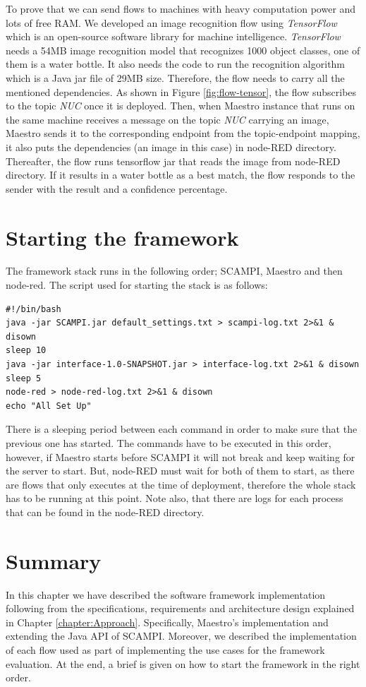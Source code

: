 To prove that we can send flows to machines with heavy computation power and lots of free RAM. We developed an image recognition flow using \textit{TensorFlow} which is an open-source software library for machine intelligence. \textit{TensorFlow} needs a 54MB image recognition model that recognizes 1000 object classes, one of them is a water bottle. It also needs the code to run the recognition algorithm which is a Java jar file of 29MB size. Therefore, the flow  needs to carry all the mentioned dependencies. As shown in Figure \ref{fig:flow-tensor}, the flow subscribes to the topic \textit{NUC} once it is deployed. Then, when Maestro instance that runs on the same machine receives a message on the topic \textit{NUC} carrying an image, Maestro sends it to the corresponding endpoint  from the topic-endpoint mapping, it also puts the dependencies (an image in this case) in node-RED directory. Thereafter, the flow runs tensorflow jar that reads the image from  node-RED directory. If it results in a water bottle as a best match, the flow responds to the sender with the result and a confidence percentage.

\section{Starting the framework}\label{subsec:starting-framework}

The framework stack runs in the following order; SCAMPI, Maestro and then node-red. The script used for starting the stack is as follows:
\begin{verbatim}
#!/bin/bash
java -jar SCAMPI.jar default_settings.txt > scampi-log.txt 2>&1 & disown
sleep 10
java -jar interface-1.0-SNAPSHOT.jar > interface-log.txt 2>&1 & disown
sleep 5
node-red > node-red-log.txt 2>&1 & disown
echo "All Set Up"
\end{verbatim}
There is a sleeping period between each command in order to make sure that the previous one has started. The commands have to be executed in this order, however, if Maestro starts before SCAMPI it will not break and keep waiting for the server to start. But, node-RED must wait for both of them to start, as there are flows that only executes at the time of deployment, therefore the whole stack has to be running at this point. Note also, that there are logs for each process that can be found in the node-RED directory. 


\section{Summary}

In this chapter we have described the software framework implementation following from the specifications, requirements and architecture design explained in Chapter \ref{chapter:Approach}. Specifically, Maestro's implementation and extending the Java API of SCAMPI. Moreover, we described the implementation of each flow used as part of implementing the use cases for the framework evaluation. At the end,  a brief is given on how to start the framework in the right order.